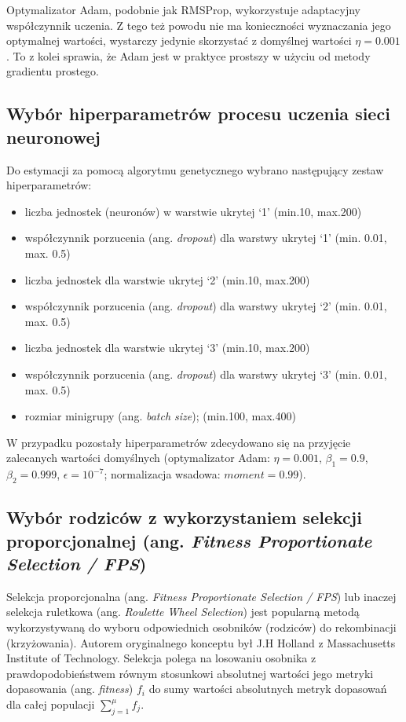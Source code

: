 \documentclass[a4paper,11pt]{article}
\begin{document}
    \bigskip

    Optymalizator Adam, podobnie jak RMSProp, wykorzystuje adaptacyjny współczynnik uczenia. Z tego też powodu nie ma konieczności wyznaczania jego optymalnej wartości, wystarczy jedynie skorzystać z domyślnej wartości $\eta = 0.001$\cite{UczenieMaszynowe2018}. To z kolei sprawia, że Adam jest w praktyce prostszy w użyciu od metody gradientu prostego.

    \subsection{Wybór hiperparametrów procesu uczenia sieci neuronowej}

    Do estymacji za pomocą algorytmu genetycznego wybrano następujący zestaw hiperparametrów:
    \begin{itemize}
        \item liczba jednostek (neuronów) w warstwie ukrytej `1' (min.10, max.200)
        \item współczynnik porzucenia (ang. \textit{dropout}) dla warstwy ukrytej `1' (min. 0.01, max. 0.5)
        \item liczba jednostek dla warstwie ukrytej `2' (min.10, max.200)
        \item współczynnik porzucenia (ang. \textit{dropout}) dla warstwy ukrytej `2' (min. 0.01, max. 0.5)
        \item liczba jednostek dla warstwie ukrytej `3' (min.10, max.200)
        \item współczynnik porzucenia (ang. \textit{dropout}) dla warstwy ukrytej `3' (min. 0.01, max. 0.5)
        \item rozmiar minigrupy (ang. \textit{batch size}); (min.100, max.400)
    \end{itemize}

    \bigskip

    W przypadku pozostały hiperparametrów zdecydowano się na przyjęcie zalecanych wartości domyślnych (optymalizator Adam: $\eta = 0.001$, $\beta_{1} = 0.9$, $\beta_{2} = 0.999$, $\epsilon = 10^{-7}$; normalizacja wsadowa: $moment = 0.99$).

    \subsection{Wybór rodziców z wykorzystaniem selekcji proporcjonalnej (ang. \textit{Fitness Proportionate Selection / FPS})}

    Selekcja proporcjonalna (ang. \textit{Fitness Proportionate Selection / FPS}) lub inaczej selekcja ruletkowa (ang. \textit{Roulette Wheel Selection}) jest popularną metodą wykorzystywaną do wyboru odpowiednich osobników (rodziców) do rekombinacji (krzyżowania). Autorem oryginalnego konceptu był J.H Holland z Massachusetts Institute of Technology. Selekcja polega na losowaniu osobnika z prawdopodobieństwem równym stosunkowi absolutnej wartości jego metryki dopasowania (ang. \textit{fitness}) $f_{i}$ do sumy wartości absolutnych metryk dopasowań dla całej populacji $\sum_{j=1}^{\mu} f_{j}$\cite{IntroductionToEvolutionaryComputing2015}.
\end{document}
